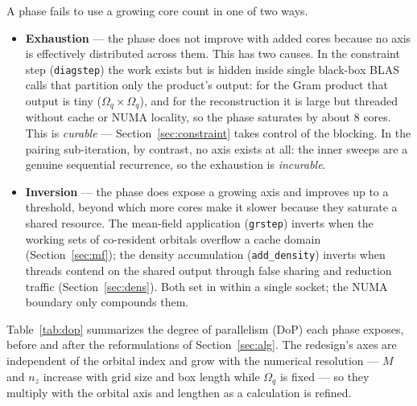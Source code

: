 \documentclass[preprint,12pt]{elsarticle}
\numberwithin{equation}{section}
\begin{document}
A phase fails to use a growing core count in one of two ways.
\begin{itemize}
\item \textbf{Exhaustion} --- the phase does not improve with added cores because no axis is effectively distributed across them. This has two causes. In the constraint step (\texttt{diagstep}) the work exists but is hidden inside single black-box BLAS calls that partition only the product's output: for the Gram product that output is tiny ($\Omega_q\times\Omega_q$), and for the reconstruction it is large but threaded without cache or NUMA locality, so the phase saturates by about 8 cores. This is \emph{curable} --- Section~\ref{sec:constraint} takes control of the blocking. In the pairing sub-iteration, by contrast, no axis exists at all: the inner sweeps are a genuine sequential recurrence, so the exhaustion is \emph{incurable}.
\item \textbf{Inversion} --- the phase does expose a growing axis and improves up to a threshold, beyond which more cores make it slower because they saturate a shared resource. The mean-field application (\texttt{grstep}) inverts when the working sets of co-resident orbitals overflow a cache domain (Section~\ref{sec:mf}); the density accumulation (\texttt{add\_density}) inverts when threads contend on the shared output through false sharing and reduction traffic (Section~\ref{sec:dens}). Both set in within a single socket; the NUMA boundary only compounds them.
\end{itemize}

Table~\ref{tab:dop} summarizes the degree of parallelism (DoP) each phase exposes, before and after the reformulations of Section~\ref{sec:alg}. The redesign's axes are independent of the orbital index and grow with the numerical resolution --- $M$ and $n_z$ increase with grid size and box length while $\Omega_q$ is fixed --- so they multiply with the orbital axis and lengthen as a calculation is refined.
\end{document}
